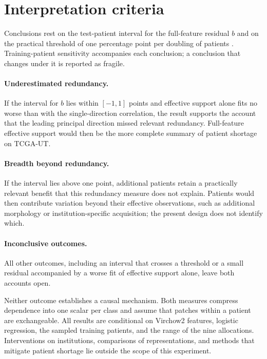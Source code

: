 \documentclass[11pt]{article}
\begin{document}
\section{Interpretation criteria}
\label{sec:interpretation}
Conclusions rest on the test-patient interval for the full-feature residual $b$ and on the practical threshold of one percentage point per doubling of patients \citep{queisler2026effectiveSupport}. Training-patient sensitivity accompanies each conclusion; a conclusion that changes under it is reported as fragile.

\paragraph{Underestimated redundancy.}
If the interval for $b$ lies within $[-1,1]$ points and effective support alone fits no worse than with the single-direction correlation, the result supports the account that the leading principal direction missed relevant redundancy. Full-feature effective support would then be the more complete summary of patient shortage on TCGA-UT.

\paragraph{Breadth beyond redundancy.}
If the interval lies above one point, additional patients retain a practically relevant benefit that this redundancy measure does not explain. Patients would then contribute variation beyond their effective observations, such as additional morphology or institution-specific acquisition; the present design does not identify which.

\paragraph{Inconclusive outcomes.}
All other outcomes, including an interval that crosses a threshold or a small residual accompanied by a worse fit of effective support alone, leave both accounts open.

Neither outcome establishes a causal mechanism. Both measures compress dependence into one scalar per class and assume that patches within a patient are exchangeable. All results are conditional on Virchow2 features, logistic regression, the sampled training patients, and the range of the nine allocations. Interventions on institutions, comparisons of representations, and methods that mitigate patient shortage lie outside the scope of this experiment.





\clearpage
\appendix

\end{document}
